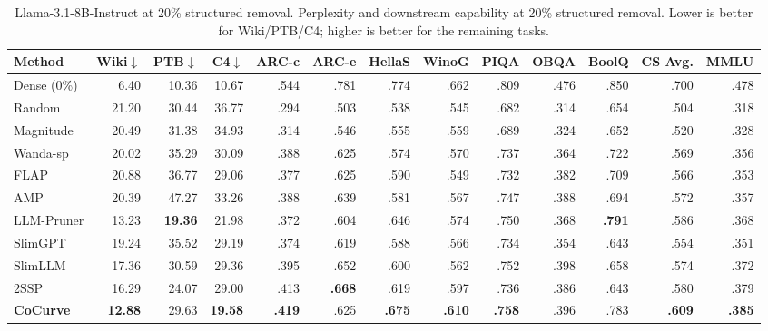 \documentclass[12pt,a4paper]{article}
\newcommand{\method}[1]{{\sffamily\bfseries\color{MethodBlue}#1}}
\newcommand{\XDB}{\method{XDomainBench}}
\newcommand{\SubspacePath}{\method{SubspacePath Pruner}}
\newcommand{\CoCurve}{\method{CoCurve}}
\newcommand{\AnchorPath}{\method{AnchorPath}}
\newcommand{\CoAx}{\method{CoAx}}
\def\method#1{#1}\def\XDB{XDomainBench}\def\SubspacePath{SubspacePath Pruner}%
\def\CoCurve{CoCurve}\def\AnchorPath{AnchorPath}\def\CoAx{CoAx}%
\begin{document}
\begin{table}[tbp]
\centering\singlespacing\scriptsize
\caption{Llama-3.1-8B-Instruct at 20\% structured removal. Perplexity and downstream capability at 20\% structured removal. Lower is better for Wiki/PTB/C4; higher is better for the remaining tasks.}
\label{tab:cc-main}
\setlength{\tabcolsep}{2.1pt}
\begin{adjustbox}{max width=\textwidth}
\begin{tabular}{lrrrrrrrrrrrr}
\toprule
\textbf{Method} & \textbf{Wiki}$\downarrow$ & \textbf{PTB}$\downarrow$ & \textbf{C4}$\downarrow$ & \textbf{ARC-c} & \textbf{ARC-e} & \textbf{HellaS} & \textbf{WinoG} & \textbf{PIQA} & \textbf{OBQA} & \textbf{BoolQ} & \textbf{CS Avg.} & \textbf{MMLU}\\
\midrule
Dense (0\%) & 6.40 & 10.36 & 10.67 & .544 & .781 & .774 & .662 & .809 & .476 & .850 & .700 & .478\\
Random & 21.20 & 30.44 & 36.77 & .294 & .503 & .538 & .545 & .682 & .314 & .654 & .504 & .318\\
Magnitude & 20.49 & 31.38 & 34.93 & .314 & .546 & .555 & .559 & .689 & .324 & .652 & .520 & .328\\
Wanda-sp & 20.02 & 35.29 & 30.09 & .388 & .625 & .574 & .570 & .737 & .364 & .722 & .569 & .356\\
FLAP & 20.88 & 36.77 & 29.06 & .377 & .625 & .590 & .549 & .732 & .382 & .709 & .566 & .353\\
AMP & 20.39 & 47.27 & 33.26 & .388 & .639 & .581 & .567 & .747 & .388 & .694 & .572 & .357\\
LLM-Pruner & 13.23 & \textbf{19.36} & 21.98 & .372 & .604 & .646 & .574 & .750 & .368 & \textbf{.791} & .586 & .368\\
SlimGPT & 19.24 & 35.52 & 29.19 & .374 & .619 & .588 & .566 & .734 & .354 & .643 & .554 & .351\\
SlimLLM & 17.36 & 30.59 & 29.36 & .395 & .652 & .600 & .562 & .752 & .398 & .658 & .574 & .372\\
2SSP & 16.29 & 24.07 & 29.00 & .413 & \textbf{.668} & .619 & .597 & .736 & .386 & .643 & .580 & .379\\
\textbf{\CoCurve{}} & \textbf{12.88} & 29.63 & \textbf{19.58} & \textbf{.419} & .625 & \textbf{.675} & \textbf{.610} & \textbf{.758} & .396 & .783 & \textbf{.609} & \textbf{.385}\\
\bottomrule
\end{tabular}
\end{adjustbox}
\end{table}
\end{document}
